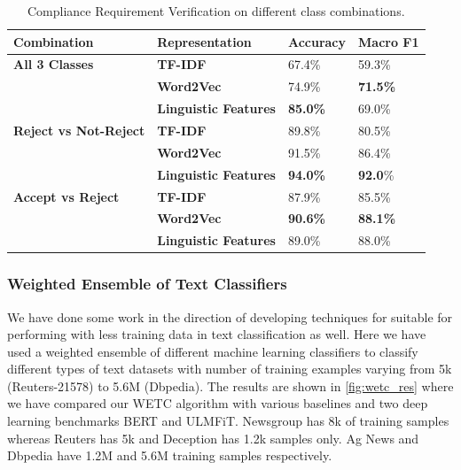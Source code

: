 \begin{table}
	\centering
	\caption{Compliance Requirement Verification on different class combinations.}\label{tab:azoth_res1}
	\begin{tabular}{|l|l|l|l|}
		\hline
		{\bfseries Combination} & {\bfseries Representation} & {\bfseries Accuracy} & {\bfseries Macro F1}\\
		\hline

		{\bfseries All 3 Classes} & {\bfseries TF-IDF} & 67.4\% & 59.3\% \\
		& {\bfseries Word2Vec} & 74.9\% & \textbf{71.5\%} \\
		& {\bfseries Linguistic Features} & \textbf{85.0\%} & 69.0\% \\
		\hline
		
		{\bfseries Reject vs Not-Reject} & {\bfseries TF-IDF} & 89.8\% & 80.5\%\\
		 & {\bfseries Word2Vec} & 91.5\% & 86.4\%\\
		 & {\bfseries Linguistic Features} & {\bfseries 94.0\%} & {\bfseries92.0}\%\\
		\hline
		
		{\bfseries Accept vs Reject} & {\bfseries TF-IDF} & 87.9\% & 85.5\%\\
		 & {\bfseries Word2Vec} & {\bfseries 90.6\%} & {\bfseries 88.1\%}\\
		 & {\bfseries Linguistic Features} & 89.0\% & 88.0\%\\
		\hline

	\end{tabular}
\end{table}

\subsubsection{Weighted Ensemble of Text Classifiers}\label{sec:wetc}
We have done some work in the direction of developing techniques for suitable for performing with less training data in text classification as well. Here we have used a weighted ensemble of different machine learning classifiers to classify different types of text datasets with number of training examples varying from 5k (Reuters-21578) to 5.6M (Dbpedia). The results are shown in \cref{fig:wetc_res} where we have compared our WETC algorithm with various baselines and two deep learning benchmarks BERT and ULMFiT. Newsgroup has 8k of training samples whereas Reuters has 5k and Deception has 1.2k samples only. Ag News and Dbpedia have 1.2M and 5.6M training samples respectively.

